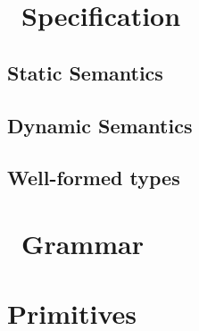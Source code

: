 \section{\lang\ Specification}

%
\subsection{Static Semantics}\label{subsec:static_sem}
\ottdefnsTypes%

\subsection{Dynamic Semantics}\label{subsec:dyn_sem}
\ottdefnsOpXXSem%

\clearpage






\subsection{Well-formed types}
\ottdefnsWellXXFormed%

\section{\lang\ Grammar}\label{sec:grammar_def}
\ottgrammar%

\clearpage
\section{Primitives}\label{subsec:primitives}


